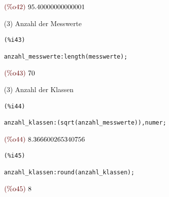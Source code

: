 \documentclass{article}
\begin{document}
\begin{math}\displaystyle
\parbox{8ex}{\color{labelcolor}(\%o42) }
95.40000000000001
\end{math}

(3)
Anzahl der Messwerte

\noindent
\begin{minipage}[t]{8ex}{\color{red}\bf
\begin{verbatim}
(%i43) 
\end{verbatim}}
\end{minipage}
\begin{minipage}[t]{\textwidth}{\color{blue}
\begin{verbatim}
anzahl_messwerte:length(messwerte);
\end{verbatim}}
\end{minipage}
\begin{math}\displaystyle
\parbox{8ex}{\color{labelcolor}(\%o43) }
70
\end{math}

(3)
Anzahl der Klassen

\noindent
\begin{minipage}[t]{8ex}{\color{red}\bf
\begin{verbatim}
(%i44) 
\end{verbatim}}
\end{minipage}
\begin{minipage}[t]{\textwidth}{\color{blue}
\begin{verbatim}
anzahl_klassen:(sqrt(anzahl_messwerte)),numer;
\end{verbatim}}
\end{minipage}
\begin{math}\displaystyle
\parbox{8ex}{\color{labelcolor}(\%o44) }
8.366600265340756
\end{math}


\noindent
\begin{minipage}[t]{8ex}{\color{red}\bf
\begin{verbatim}
(%i45) 
\end{verbatim}}
\end{minipage}
\begin{minipage}[t]{\textwidth}{\color{blue}
\begin{verbatim}
anzahl_klassen:round(anzahl_klassen);
\end{verbatim}}
\end{minipage}
\begin{math}\displaystyle
\parbox{8ex}{\color{labelcolor}(\%o45) }
8
\end{math}
\end{document}
